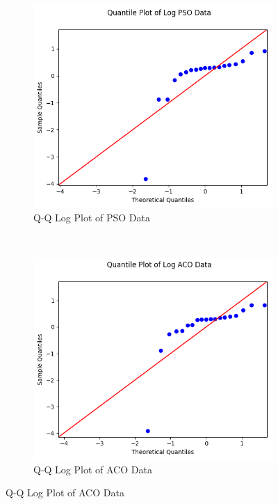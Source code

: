 \documentclass{report}
\begin{document}
\begin{figure}[H]
	\begin{subfigure}[h]{0.4\textwidth}
		\centering
		\includegraphics[width=\textwidth]{images/pso_log_qq}
		\caption{Q-Q Log Plot of PSO Data}
		\label{fig:qqlogpso}
	\end{subfigure}
	~
	\begin{subfigure}[h]{0.4\textwidth}
		\centering
		\includegraphics[width=\textwidth]{images/aco_log_qq}
		\caption{Q-Q Log Plot of ACO Data}
		\label{fig:qqlogaco}

\end{subfigure}
\end{figure}
\end{document}
